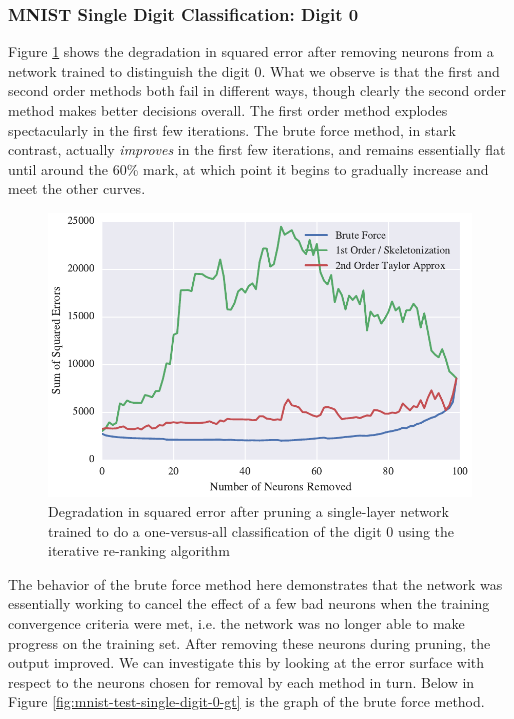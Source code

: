 \subsubsection{MNIST Single Digit Classification: Digit 0}

Figure \ref{fig:mnist-test-single-digit-0} shows the degradation in squared error after removing neurons from a network trained to distinguish the digit 0. What we observe is that the first and second order methods both fail in different ways, though clearly the second order method makes better decisions overall. The first order method explodes spectacularly in the first few iterations. The brute force method, in stark contrast, actually \textit{improves} in the first few iterations, and remains essentially flat until around the 60\% mark, at which point it begins to gradually increase and meet the other curves. 

\begin{figure}[!ht]
\centering
\includegraphics[width=0.5\linewidth]{png/mnist-test-single-digit-0.pdf}
\caption{Degradation in squared error after pruning a single-layer network trained to do a one-versus-all classification of the digit 0 using the iterative re-ranking algorithm}
\label{fig:mnist-test-single-digit-0}
\end{figure}

The behavior of the brute force method here demonstrates that the network was essentially working to cancel the effect of a few bad neurons when the training convergence criteria were met, i.e. the network was no longer able to make progress on the training set. After removing these neurons during pruning, the output improved. We can investigate this by looking at the error surface with respect to the neurons chosen for removal by each method in turn. Below in Figure \ref{fig:mnist-test-single-digit-0-gt} is the graph of the brute force method. 

